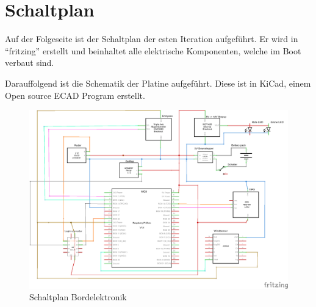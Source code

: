 \chapter{Schaltplan}
\label{appendix:schaltplan}
Auf der Folgeseite ist der Schaltplan der esten Iteration aufgeführt. Er wird in \enquote{fritzing} erstellt und beinhaltet alle elektrische Komponenten, welche im Boot verbaut sind.

Darauffolgend ist die Schematik der Platine aufgeführt. Diese ist in KiCad, einem Open source ECAD Program erstellt.

\begin{figure}[H]
    \centering
    \includegraphics[angle=90,width=\textwidth,height=\textheight,keepaspectratio]{assets/Boat Electronics3_Schaltplanfinal.png}
    \caption{Schaltplan Bordelektronik}
\end{figure}
